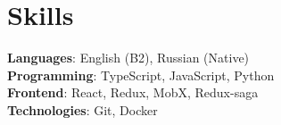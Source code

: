 \documentclass[A4,11pt]{article}
\begin{document}

\section{Skills}
 \begin{itemize}[leftmargin=0.5cm, label={}]
    \small{\item{
     \textbf{Languages}{: English (B2), Russian (Native) } \\
     \textbf{Programming}{: TypeScript, JavaScript, Python } \\
     \textbf{Frontend}{: React, Redux, MobX, Redux-saga } \\
     \textbf{Technologies}{: Git, Docker } \\
    }}
 \end{itemize}
    
\end{document}

